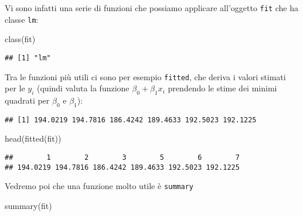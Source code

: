 \documentclass[
]{article}
\newenvironment{Shaded}{\begin{snugshade}}{\end{snugshade}}
\newcommand{\DecValTok}[1]{\textcolor[rgb]{0.00,0.00,0.81}{#1}}
\newcommand{\FunctionTok}[1]{\textcolor[rgb]{0.00,0.00,0.00}{#1}}
\newcommand{\NormalTok}[1]{#1}
\newcommand{\SpecialCharTok}[1]{\textcolor[rgb]{0.00,0.00,0.00}{#1}}
\begin{document}
Vi sono infatti una serie di funzioni che possiamo applicare all'oggetto
\texttt{fit} che ha classe \texttt{lm}:

\begin{Shaded}
\begin{Highlighting}[]
\FunctionTok{class}\NormalTok{(fit)}
\end{Highlighting}
\end{Shaded}

\begin{verbatim}
## [1] "lm"
\end{verbatim}

Tra le funzioni più utili ci sono per esempio \texttt{fitted}, che
deriva i valori stimati per le \(y_i\) (quindi valuta la funzione
\(\beta_0 + \beta_1 x_i\) prendendo le stime dei minimi quadrati per
\(\beta_0\) e \(\beta_1\)):

\begin{Shaded}
\end{Shaded}

\begin{verbatim}
## [1] 194.0219 194.7816 186.4242 189.4633 192.5023 192.1225
\end{verbatim}

\begin{Shaded}
\begin{Highlighting}[]
\FunctionTok{head}\NormalTok{(}\FunctionTok{fitted}\NormalTok{(fit))}
\end{Highlighting}
\end{Shaded}

\begin{verbatim}
##        1        2        3        5        6        7 
## 194.0219 194.7816 186.4242 189.4633 192.5023 192.1225
\end{verbatim}

Vedremo poi che una funzione molto utile è \texttt{summary}

\begin{Shaded}
\begin{Highlighting}[]
\FunctionTok{summary}\NormalTok{(fit)}
\end{Highlighting}
\end{Shaded}
\end{document}
